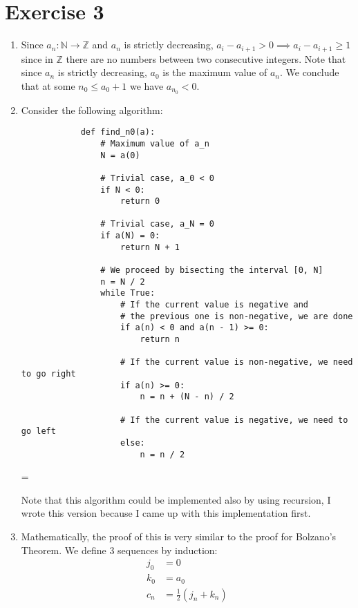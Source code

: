 \documentclass[10pt]{article}
\newcommand{\N}{\mathbb{N}}
\newcommand{\Z}{\mathbb{Z}}
\newenvironment{absolutelynopagebreak}
  {\par\nobreak\vfil\penalty0\vfilneg
   \vtop\bgroup}
  {\par\xdef\tpd{\the\prevdepth}\egroup
   \prevdepth=\tpd}
\begin{document}
\section*{Exercise 3}

\begin{enumerate}
    \item Since $a_n: \N \to \Z$ and $a_n$ is strictly decreasing,
          $a_{i} - a_{i+1} > 0 \implies a_{i} - a_{i+1} \geq 1$ since in $\Z$ there are no numbers between two consecutive integers.
          Note that since $a_n$ is strictly decreasing, $a_0$ is the maximum value of $a_n$.
          We conclude that at some $n_0 \leq a_0 + 1$ we have $a_{n_0} < 0$.

    \item Consider the following algorithm:
          \begin{absolutelynopagebreak}
              \begin{verbatim}
            def find_n0(a):
                # Maximum value of a_n
                N = a(0)

                # Trivial case, a_0 < 0
                if N < 0:
                    return 0
                
                # Trivial case, a_N = 0
                if a(N) = 0:
                    return N + 1

                # We proceed by bisecting the interval [0, N]
                n = N / 2
                while True:
                    # If the current value is negative and 
                    # the previous one is non-negative, we are done
                    if a(n) < 0 and a(n - 1) >= 0:
                        return n

                    # If the current value is non-negative, we need to go right
                    if a(n) >= 0:
                        n = n + (N - n) / 2

                    # If the current value is negative, we need to go left
                    else:
                        n = n / 2
          \end{verbatim}
          \end{absolutelynopagebreak}

          Note that this algorithm could be implemented also by using recursion, I wrote this version because I came up with this implementation first.

    \item Mathematically, the proof of this is very similar to the proof for Bolzano's Theorem.
          We define 3 sequences by induction:
          \begin{align*}
              j_0 & = 0                      \\
              k_0 & = a_0                    \\
              c_n & = \frac{1}{2}(j_n + k_n) \\
          \end{align*}


\end{enumerate}
\end{document}
